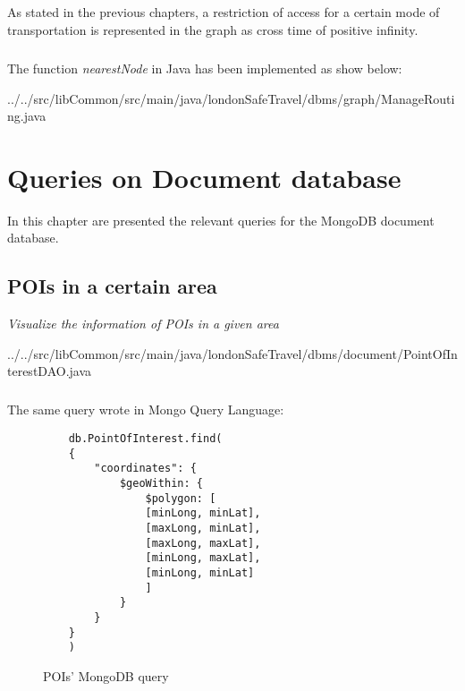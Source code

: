 \paragraph{}
As stated in the previous chapters, a restriction of access for a certain mode of transportation is represented in the graph as cross time of positive infinity.

\paragraph{}
The function \textit{nearestNode} in Java has been implemented as show below:

{../../src/libCommon/src/main/java/londonSafeTravel/dbms/graph/ManageRouting.java}

\chapter{Queries on Document database}
In this chapter are presented the relevant queries for the
MongoDB document database.

\section{POIs in a certain area}
\textit{Visualize the information of POIs in a given area}


{../../src/libCommon/src/main/java/londonSafeTravel/dbms/document/PointOfInterestDAO.java}

\paragraph{}
The same query wrote in Mongo Query Language:
\begin{figure}[H]
\begin{lstlisting}
	db.PointOfInterest.find(
	{
		"coordinates": {
			$geoWithin: {
				$polygon: [
				[minLong, minLat],
				[maxLong, minLat],
				[maxLong, maxLat],
				[minLong, maxLat],
				[minLong, minLat]
				]
			}
		}
	}
	)
\end{lstlisting}
\caption{POIs' MongoDB query}
\end{figure}

